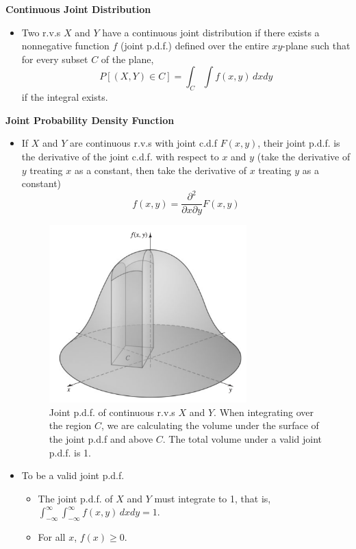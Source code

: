 \documentclass[11pt]{article}
\begin{document}
\textbf{Continuous Joint Distribution}
\begin{itemize}
    \item Two r.v.s $X$ and $Y$ have a continuous joint distribution if there exists a 
    nonnegative function $f$ (joint p.d.f.) defined over the entire $xy$-plane such that for 
    every subset $C$ of the plane, 
    \[P[(X,Y) \in C] = \int_C \int f(x,y) \,dxdy\]
    if the integral exists.
\end{itemize}

\textbf{Joint Probability Density Function}
\begin{itemize}
    \item If $X$ and $Y$ are continuous r.v.s with joint c.d.f $F(x,y)$, their joint p.d.f. is 
    the derivative of the joint c.d.f. with respect to $x$ and $y$ (take the derivative of $y$
    treating $x$ as a constant, then take the derivative of $x$ treating $y$ as a constant)
    \[ f(x,y) = \frac{\partial^2}{\partial x \partial y} F(x,y) \]
    \begin{figure}[H] 
        \centering 
        \includegraphics[width=3in]{imgs/joint_pdf.png}
        \caption{Joint p.d.f. of continuous r.v.s $X$ and $Y$. When integrating over the region 
        $C$, we are calculating the volume under the surface of the joint p.d.f and above $C$.
        The total volume under a valid joint p.d.f. is 1.}
    \end{figure}
    \item To be a valid joint p.d.f.
    \begin{itemize}
        \item The joint p.d.f. of $X$ and $Y$ must integrate to 1, that is, $\int_{-\infty}^{\infty}
        \int_{-\infty}^{\infty} f(x,y) \,dxdy =1$.
        \item For all $x$, $f(x) \ge 0$.
    \end{itemize}
\end{itemize}
\end{document}
